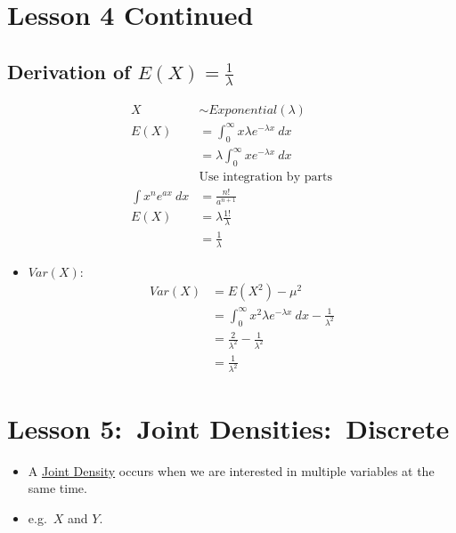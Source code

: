 \documentclass[12pt]{article}
\begin{document}
    \section{Lesson 4 Continued}
        \subsection{Derivation of \texorpdfstring{$E(X) = \frac{1}{\lambda}$}{Expected Value of an Exponential Distribution}}
            \begin{align*}
                X &\sim Exponential(\lambda) \\
                E(X) &= \int_{0}^{\infty} {x}{\lambda}{e^{-\lambda x}}\ dx \\
                &= \lambda \int_{0}^{\infty} x e^{-\lambda x}\ dx \\
                &\text{Use integration by parts} \\
                \int x^n e^{ax}\ dx &= \frac{n!}{a^{n+1}} \\
                E(X) &= \lambda\frac{1!}{\lambda} \\
                &= \frac{1}{\lambda}
            \end{align*}
            \begin{itemize}
                \item $Var(X)$:
                \begin{align*}
                    Var(X) &= E(X^2) - \mu^2 \\
                    &= \int_{0}^{\infty} x^2 \lambda e^{-\lambda x}\ dx - \frac{1}{\lambda^2} \\
                    &= \frac{2}{\lambda^2} - \frac{1}{\lambda^2} \\
                    &= \frac{1}{\lambda^2}
                \end{align*}
            \end{itemize}
    \section{Lesson 5:\ Joint Densities:\ Discrete}
        \begin{itemize}
            \item A \underline{Joint Density} occurs when we are interested in multiple variables at the same time.
            \item e.g.\ $X$ and $Y$.
        \end{itemize}
\end{document}
